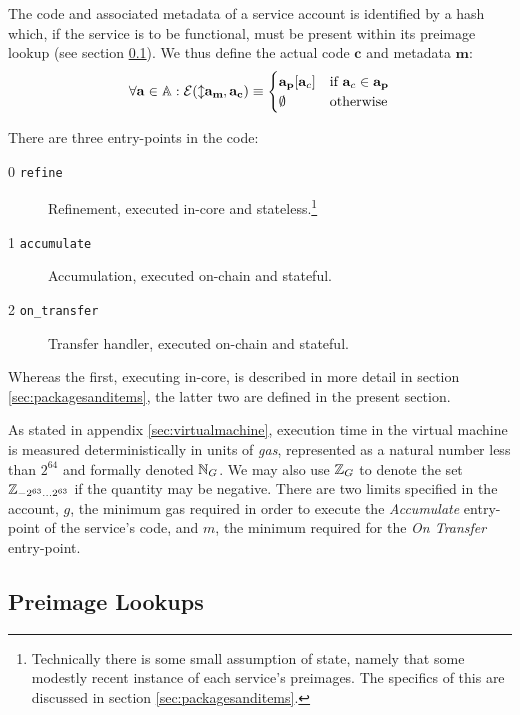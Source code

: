 The code and associated metadata of a service account is identified by a hash which, if the service is to be functional, must be present within its preimage lookup (see section \ref{sec:lookups}). We thus define the actual code $\mathbf{c}$ and metadata $\mathbf{m}$:
\begin{align}
  \forall \mathbf{a} \in \mathbb{A} : \se(\var{\mathbf{a}_\mathbf{m}}, \mathbf{a}_\mathbf{c}) \equiv \begin{cases}
    \mathbf{a}_\mathbf{p}[\mathbf{a}_c] &\when \mathbf{a}_c \in \mathbf{a}_\mathbf{p} \\
    \none &\otherwise
  \end{cases}
\end{align}

There are three entry-points in the code:
\begin{description}
  \item[0 \texttt{refine}]Refinement, executed in-core and stateless.\footnote{Technically there is some small assumption of state, namely that some modestly recent instance of each service's preimages. The specifics of this are discussed in section \ref{sec:packagesanditems}.}
  \item[1 \texttt{accumulate}] Accumulation, executed on-chain and stateful.
  \item[2 \texttt{on\_transfer}] Transfer handler, executed on-chain and stateful.
\end{description}

Whereas the first, executing in-core, is described in more detail in section \ref{sec:packagesanditems}, the latter two are defined in the present section.

As stated in appendix \ref{sec:virtualmachine}, execution time in the \Jam virtual machine is measured deterministically in units of \emph{gas}, represented as a natural number less than $2^{64}$ and formally denoted $\mathbb{N}_G$. We may also use $\mathbb{Z}_G$ to denote the set $\mathbb{Z}_{-2^{63}\dots2^{63}}$ if the quantity may be negative. There are two limits specified in the account, $g$, the minimum gas required in order to execute the \emph{Accumulate} entry-point of the service's code, and $m$, the minimum required for the \emph{On Transfer} entry-point.










\subsection{Preimage Lookups}\label{sec:lookups}


